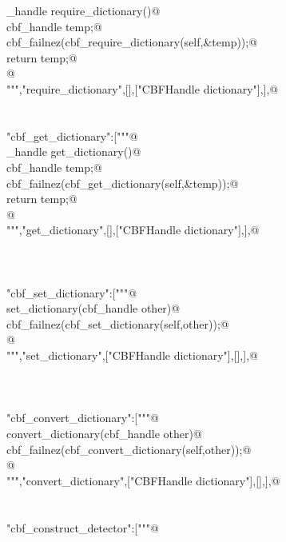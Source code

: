 \documentclass[10pt,a4paper,twoside,notitlepage]{article}
\begin{document}
\begin{flushleft}
\begin{list}{}{}
\mbox{}\verb@cbf_handle require_dictionary(){@\\
\mbox{}\verb@   cbf_handle temp;@\\
\mbox{}\verb@   cbf_failnez(cbf_require_dictionary(self,&temp));@\\
\mbox{}\verb@   return temp;@\\
\mbox{}\verb@}@\\
\mbox{}\verb@""","require_dictionary",[],["CBFHandle dictionary"],],@\\
\mbox{}\verb@@\\
\mbox{}\verb@@\\
\mbox{}\verb@"cbf_get_dictionary":["""@\\
\mbox{}\verb@cbf_handle get_dictionary(){@\\
\mbox{}\verb@   cbf_handle temp;@\\
\mbox{}\verb@   cbf_failnez(cbf_get_dictionary(self,&temp));@\\
\mbox{}\verb@   return temp;@\\
\mbox{}\verb@}@\\
\mbox{}\verb@""","get_dictionary",[],["CBFHandle dictionary"],],@\\
\mbox{}\verb@@\\
\mbox{}\verb@@\\
\mbox{}\verb@@\\
\mbox{}\verb@"cbf_set_dictionary":["""@\\
\mbox{}\verb@void set_dictionary(cbf_handle other){@\\
\mbox{}\verb@   cbf_failnez(cbf_set_dictionary(self,other));@\\
\mbox{}\verb@}@\\
\mbox{}\verb@""","set_dictionary",["CBFHandle dictionary"],[],],@\\
\mbox{}\verb@@\\
\mbox{}\verb@@\\
\mbox{}\verb@@\\
\mbox{}\verb@"cbf_convert_dictionary":["""@\\
\mbox{}\verb@void convert_dictionary(cbf_handle other){@\\
\mbox{}\verb@   cbf_failnez(cbf_convert_dictionary(self,other));@\\
\mbox{}\verb@}@\\
\mbox{}\verb@""","convert_dictionary",["CBFHandle dictionary"],[],],@\\
\mbox{}\verb@@\\
\mbox{}\verb@@\\
\mbox{}\verb@"cbf_construct_detector":["""@\\

\end{list}
\end{flushleft}
\end{document}
